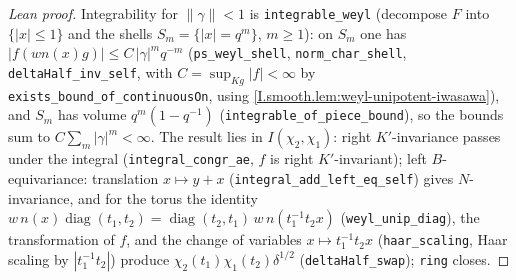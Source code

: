 \begin{proof}[Lean proof]
Integrability for $\|\gamma\|<1$ is \texttt{integrable\_weyl} (decompose $F$ into $\{|x|\le1\}$ and the shells $S_m=\{|x|=q^m\}$, $m\ge1$): on $S_m$ one has $|f(wn(x)g)|\le C\,|\gamma|^mq^{-m}$ (\texttt{ps\_weyl\_shell}, \texttt{norm\_char\_shell}, \texttt{deltaHalf\_inv\_self}, with $C=\sup_{Kg}|f|<\infty$ by \texttt{exists\_bound\_of\_continuousOn}, using \cref{I.smooth.lem:weyl-unipotent-iwasawa}), and $S_m$ has volume $q^m(1-q^{-1})$ (\texttt{integrable\_of\_piece\_bound}), so the bounds sum to $C\sum_m|\gamma|^m<\infty$. The result lies in $I(\chi_2,\chi_1)$: right $K'$-invariance passes under the integral (\texttt{integral\_congr\_ae}, $f$ is right $K'$-invariant); left $B$-equivariance: translation $x\mapsto y+x$ (\texttt{integral\_add\_left\_eq\_self}) gives $N$-invariance, and for the torus the identity $w\,n(x)\operatorname{diag}(t_1,t_2)=\operatorname{diag}(t_2,t_1)\,w\,n(t_1^{-1}t_2x)$ (\texttt{weyl\_unip\_diag}), the transformation of $f$, and the change of variables $x\mapsto t_1^{-1}t_2x$ (\texttt{haar\_scaling}, Haar scaling by $|t_1^{-1}t_2|$) produce $\chi_2(t_1)\chi_1(t_2)\delta^{1/2}$ (\texttt{deltaHalf\_swap}); \texttt{ring} closes.
\end{proof}

